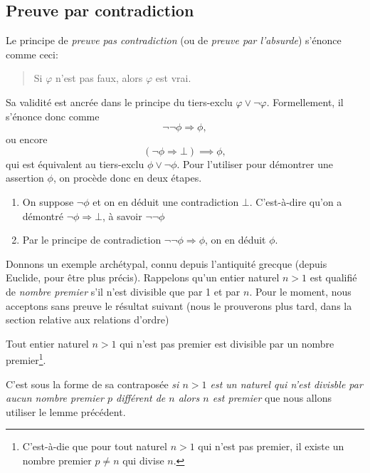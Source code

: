 \documentclass[french,course,oneside,theoremnosection]{lecture}
\newcommand{\iimplies}{\Rightarrow}
\begin{document}
\subsection{Preuve par contradiction}
Le principe de \emph{preuve pas contradiction} (ou de \emph{preuve par l'absurde}) s'énonce comme ceci:
\begin{quotation}
Si $\varphi$ n'est pas faux, alors $ \varphi$ est vrai.
\end{quotation}
Sa validité est ancrée dans le principe du tiers-exclu $\varphi \vee \neg \varphi$. Formellement, il s'énonce donc comme
\[
\neg\neg \phi \iimplies \phi,
\]
ou encore 
\[
(\neg \phi \iimplies \bot) \implies \phi,
\]
qui est équivalent au tiers-exclu $\phi \vee \neg \phi$.
Pour l'utiliser pour démontrer une assertion $\phi$, on procède donc en deux étapes.
\begin{enumerate}[(1)]
\item On suppose $\neg \phi$ et on en déduit une contradiction $\bot$. C'est-à-dire qu'on a démontré $\neg \phi \iimplies \bot$, à savoir $\neg\neg \phi$
\item Par le principe de contradiction $\neg\neg \phi \iimplies \phi$, on en déduit $\phi$.
\end{enumerate}

Donnons un exemple archétypal, connu depuis l'antiquité grecque (depuis Euclide, pour être plus précis). Rappelons qu'un entier naturel $n>1$ est qualifié de \emph{nombre premier} s'il n'est divisible que par 1 et par $n$. Pour le moment, nous acceptons sans preuve le résultat suivant (nous le prouverons plus tard, dans la section relative aux relations d'ordre)
\begin{lemma}\label{lem:prem}
Tout entier naturel $n>1$ qui n'est pas premier est divisible par un nombre premier\footnote{C'est-à-die que pour tout naturel $n>1$ qui n'est pas premier, il existe un nombre premier $p\neq n$ qui divise $n$.}.
\end{lemma}

C'est sous la forme de sa contraposée \emph{si $n>1$ est un naturel qui n'est divisble par aucun nombre premier $p$ différent de $n$ alors $n$ est premier} que nous allons utiliser le lemme précédent.
\end{document}
